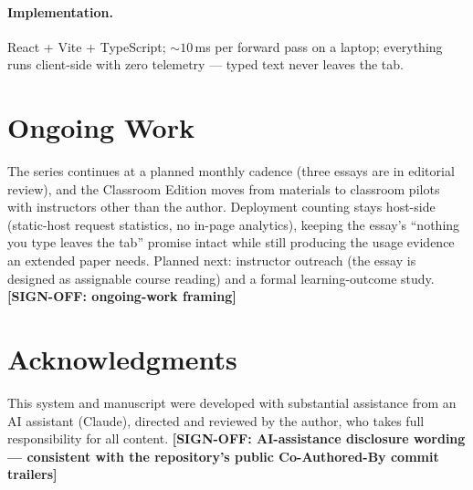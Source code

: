 \documentclass[letterpaper]{article}
\newcommand{\signoff}[1]{{\color{red!75!black}\bfseries [SIGN-OFF: #1]}}
\newcommand{\signoff}[1]{}
\begin{document}
\paragraph{Implementation.}
React + Vite + TypeScript; ${\sim}10$\,ms per forward pass on a laptop;
everything runs client-side with zero telemetry --- typed text never
leaves the tab.

\section{Ongoing Work}

The series continues at a planned monthly cadence (three essays are in
editorial review), and the Classroom Edition moves from materials to
classroom pilots with instructors other than the author. Deployment
counting stays host-side (static-host request statistics, no in-page
analytics), keeping the essay's ``nothing you type leaves the tab''
promise intact while still producing the usage evidence an extended
paper needs. Planned next: instructor outreach (the essay is designed
as assignable course reading) and a formal learning-outcome study.
\signoff{ongoing-work framing}

\section*{Acknowledgments}
This system and manuscript were developed with substantial assistance
from an AI assistant (Claude), directed and reviewed by the author, who
takes full responsibility for all content. \signoff{AI-assistance
disclosure wording --- consistent with the repository's public
Co-Authored-By commit trailers}

\ifaaaikitpresent
\else
  
\fi

\end{document}

